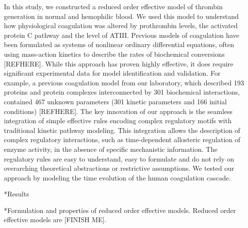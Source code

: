 \documentclass[12pt]{article}
\makeatletter
\renewcommand\subsection{\@startsection
	{subsection}{2}{0mm}
	{-0.05in}
	{-0.5\baselineskip}
	{\normalfont\normalsize\bfseries}}
\renewcommand\section{\@startsection
	{subsection}{2}{0mm}
	{-0.2in}
	{0.05\baselineskip}
	{\normalfont\large\bfseries}}
\makeatother
\begin{document}
In this study, we constructed a reduced order effective model of thrombin generation in normal and hemophilic blood.
We used this model to understand how physiological coagulation was altered by prothrombin levels, the activated protein C pathway and the level of ATIII.  
Previous models of coagulation have been formulated as systems of nonlinear ordinary differential equations, often using mass-action kinetics to describe the rates of biochemical conversions [REFHERE]. 
While this approach has proven highly effective, it does require significant experimental data for model identification and validation.    
For example, a previous coagulation model from our laboratory, which described 193 proteins and protein complexes interconnected by 301 biochemical interactions, 
contained 467 unknown parameters (301 kinetic parameters and 166 initial conditions) [REFHERE]. 
The key innovation of our approach is the seamless integration of simple effective rules encoding complex regulatory motifs with traditional kinetic pathway modeling. 
This integration allows the description of complex regulatory interactions, such as time-dependent allosteric regulation of enzyme activity, in the absence of specific mechanistic information. 
The regulatory rules are easy to understand, easy to formulate and do not rely on overarching theoretical abstractions or restrictive assumptions. 
We tested our approach by modeling the time evolution of the human coagulation cascade.

\clearpage

\section*{Results}

\subsection*{Formulation and properties of reduced order effective models.}
Reduced order effective models are [FINISH ME].

\clearpage
\end{document}
